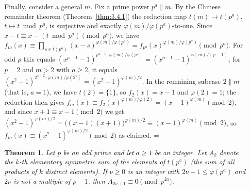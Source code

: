 \documentclass[11pt]{article}
\makeatletter
\let\nt@closedisplay\]
\def\nt@guardedclose{\@ifnextchar\par{\nt@closeafterpar}{\@ifnextchar\end{\postdisplaypenalty\@M\nt@closedisplay}{\nt@closedisplay}}}
\def\nt@closeafterpar\par{\@ifnextchar\par{\nt@closeafterpar}{\@ifnextchar\end{\postdisplaypenalty\@M\nt@closedisplay\par}{\nt@closedisplay\par}}}
\renewenvironment{proof}[1][\proofname]{\par
  \pushQED{\qed}\normalfont\topsep\medskipamount\edef\nt@afterproof{\@endparpenalty=\the\@endparpenalty\relax}\@beginparpenalty\@M\@endparpenalty\@M\let\]\nt@guardedclose\trivlist\item[]\textit{#1\@addpunct{.}} \ignorespaces}{\ifvmode\addpenalty\@M\fi\popQED\nt@afterproof\endtrivlist\@endpefalse}
\theoremstyle{ntstyle}
\newtheorem{theorem}{Theorem}[subsection]
\makeatother
\begin{document}
\begin{proof}
  Finally, consider a general $m$. Fix a prime power $p^{a} \parallel m$.
  By the Chinese remainder theorem (Theorem~\ref{thm:3.4.1}) the reduction map $t(m) \to t(p^{a})$,
  $t \mapsto t \bmod p^{a}$, is surjective and exactly $\varphi(m)/\varphi(p^{a})$-to-one.
  Since $x - t \equiv x - (t \bmod p^{a}) \pmod{p^{a}}$, we have
  $f_m(x) \equiv \prod_{s \in t(p^{a})}(x - s)^{\varphi(m)/\varphi(p^{a})} = f_{p^{a}}(x)^{\varphi(m)/\varphi(p^{a})} \pmod{p^{a}}$.
  For odd $p$
  this equals $(x^{p-1}-1)^{p^{a-1}\cdot \varphi(m)/\varphi(p^{a})} = (x^{p-1}-1)^{\varphi(m)/(p-1)}$; for $p = 2$
  and $m > 2$ with $a \ge 2$, it equals
  $(x^{2}-1)^{2^{a-2}\cdot\varphi(m)/\varphi(2^{a})} = (x^{2}-1)^{\varphi(m)/2}$. In the remaining subcase
  $2 \parallel m$ (that is, $a = 1$), we have $t(2) = \{1\}$, so
  $f_{2}(x) = x - 1$ and $\varphi(2) = 1$; the reduction then gives
  $f_m(x) \equiv f_{2}(x)^{\varphi(m)/\varphi(2)} = (x-1)^{\varphi(m)} \pmod{2}$, and since
  $x + 1 \equiv x - 1 \pmod{2}$ we get
  $(x^{2}-1)^{\varphi(m)/2} = \big((x-1)(x+1)\big)^{\varphi(m)/2} \equiv (x-1)^{\varphi(m)} \pmod{2}$, so
  $f_m(x) \equiv (x^{2}-1)^{\varphi(m)/2} \pmod{2}$ as claimed.
\end{proof}

\begin{theorem}\label{thm:6.9.2} Let $p$ be an odd prime and let $a\ge1$ be an integer. Let $A_{k}$
  denote the $k$-th elementary symmetric sum of the elements of
  $t(p^{a})$ (the sum of all products of $k$ distinct elements). If $\nu\ge0$ is an integer with
  $2\nu+1\le\varphi(p^{a})$ and $2\nu$ is not a multiple of $p-1$, then $A_{2\nu+1} \equiv 0 \pmod{p^{2a}}$.

\end{theorem}
\end{document}

